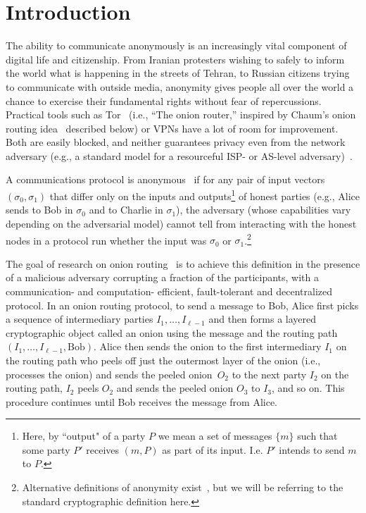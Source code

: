 \documentclass[runningheads,a4paper]{llncs}
\begin{document}
\section{Introduction}
 
The ability to communicate anonymously is an increasingly vital component of digital life and citizenship.
From Iranian protesters wishing to safely to inform the world what is happening in the streets of Tehran, to Russian citizens trying to communicate with outside media, anonymity gives people all over the world a chance to exercise their fundamental rights without fear of repercussions.  
%
Practical tools such as Tor~\cite{tor} (i.e., ``The onion router,''  inspired by Chaum's onion routing idea~\cite{Chaum81} described below) or VPNs have a lot of room for improvement.  Both are easily blocked, and neither guarantees privacy even from the network adversary (e.g., a standard model for a resourceful ISP- or AS-level adversary)~\cite{SP:MurDan05, SEVL+15, WSJCM18, gizmodo}. 

A communications protocol is anonymous~\cite{ando2019complexity} if for any pair of input vectors $(\sigma_0, \sigma_1)$ that differ only on the inputs and outputs\footnote{Here, by ``output" of a party $P$ we mean a set of messages $\{m\}$ such that some party $P'$ receives $(m,P)$ as part of its input.  I.e. $P'$ intends to send $m$ to $P$. } of honest parties (e.g., Alice sends to Bob in $\sigma_0$ and to Charlie in $\sigma_1$), the adversary (whose capabilities vary depending on the adversarial model) %
cannot tell from interacting with the honest nodes in a protocol run whether the input was $\sigma_0$ or $\sigma_1$.\footnote{Alternative definitions of anonymity exist~\cite{BKMMM,KuhnBSJS19}, but we will be referring to the standard cryptographic definition here.}  

The goal of research on onion routing~\cite{Chaum81,JC:Chaum88,C:CamLys05,vuvuzela,ICALP:AndLysUpf18,SP:KuhBecStr20,ando2019complexity,TCC:AndLys21,AC:KHRS21,TCC:ACLM22} is to achieve this definition in the presence of a malicious adversary corrupting a fraction of the participants, with a communication- and computation- efficient, fault-tolerant and decentralized protocol.   
In an onion routing protocol, to send a message to Bob, Alice first picks a sequence of intermediary parties $I_1, \dots, I_{\ell-1}$ and then forms a layered cryptographic object called an onion using the message and the routing path $(I_1, \dots, I_{\ell-1}, \text{Bob})$. %
Alice then sends the onion to the first intermediary $I_1$ on the routing path who peels off just the outermost layer of the onion (i.e., processes the onion) and sends the peeled onion~$O_2$ to the next party $I_2$ on the routing path, $I_2$ peels $O_2$ and sends the peeled onion $O_3$ to $I_3$, and so on. This procedure continues until Bob receives the message %
from Alice. 
\end{document}
